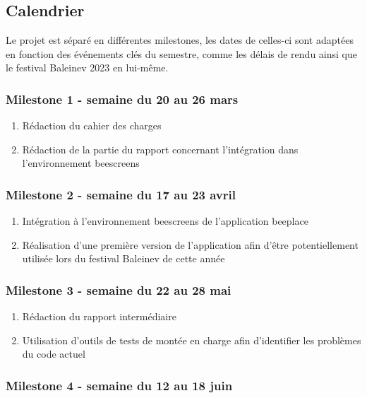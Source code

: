\subsection{Calendrier}

Le projet est séparé en différentes milestones, les dates de celles-ci sont adaptées en fonction des événements clés du semestre, comme les délais de rendu ainsi que le festival Baleinev 2023 en lui-même.

\subsubsection{Milestone 1 - semaine du 20 au 26 mars}

\begin{enumerate}
  \item Rédaction du cahier des charges
  \item Rédaction de la partie du rapport concernant l'intégration dans l'environnement \gls{beescreens}
\end{enumerate}

\subsubsection{Milestone 2 - semaine du 17 au 23 avril}

\begin{enumerate}
  \item Intégration à l'environnement \gls{beescreens} de l'application \gls{beeplace}
  \item Réalisation d'une première version de l'application afin d'être potentiellement utilisée lors du festival Baleinev de cette année
\end{enumerate}

\subsubsection{Milestone 3 - semaine du 22 au 28 mai}
\label{milestone3}

\begin{enumerate}
  \item Rédaction du rapport intermédiaire
  \item Utilisation d'outils de tests de montée en charge afin d'identifier les problèmes du code actuel
\end{enumerate}

\subsubsection{Milestone 4 - semaine du 12 au 18 juin}

